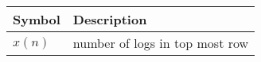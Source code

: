 \begin{tabular}{ | m{1.0cm} | m{4cm} | } 
  \hline
 Symbol & Description \\ 
 
 \hline

$x(n)$ & number of logs in top most row \\ 
\hline
\end{tabular}\\
\caption{}
\label{Table:1}
